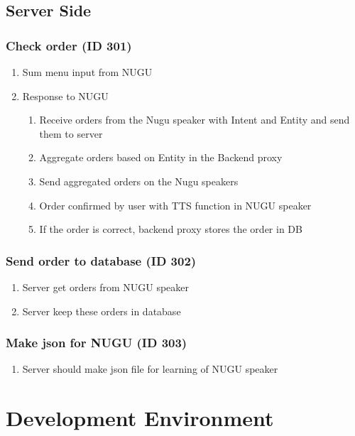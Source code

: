 \documentclass[conference,compsoc]{IEEEtran}
\begin{document}
\subsection{Server Side}

\subsubsection{Check order (ID 301)}
\begin{enumerate}
  \item Sum menu input from NUGU
  \item Response to NUGU
  \begin{enumerate}
    \item Receive orders from the Nugu speaker with Intent and Entity and send them to server
    \item Aggregate orders based on Entity in the Backend proxy
    \item Send aggregated orders on the Nugu speakers
    \item Order confirmed by user with TTS function in NUGU speaker
    \item If the order is correct, backend proxy stores the order in DB
  \end{enumerate}
\end{enumerate}

\subsubsection{Send order to database (ID 302)}
\begin{enumerate}
  \item Server get orders from NUGU speaker
  \item Server keep these orders in database  
\end{enumerate}


\subsubsection{Make json for NUGU (ID 303)}
\begin{enumerate}
  \item Server should make json file for learning of NUGU speaker  
\end{enumerate}


\section{Development Environment}
\end{document}
